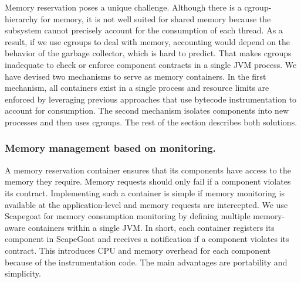 Memory reservation poses a unique challenge.
Although there is a cgroup-hierarchy for memory, it is not well suited for shared memory because the subsystem cannot precisely account for the consumption of each thread.
As a result, if we use cgroups to deal with memory, accounting would depend on the behavior of the garbage collector, which is hard to predict.
That makes cgroups inadequate to check or enforce component contracts in a single JVM process.
We have devised two mechanisms
to serve as memory containers.
In the first mechanism, all containers exist in a single process and resource limits are enforced by leveraging previous approaches
that use bytecode instrumentation to account for consumption.
The second mechanism
isolates components into new processes and then uses cgroups. %
The rest of the section describes both solutions.

\subsubsection{Memory management based on monitoring.}
A memory reservation container ensures that its components have access to the memory they require.
Memory requests should only fail if a component violates its contract.
Implementing such a container is simple if memory monitoring is available at the application-level and memory requests are intercepted.
We use Scapegoat \cite{gonzalezherrera:hal-00983045} for memory consumption monitoring by defining multiple memory-aware containers within a single JVM.
In short, each container registers its component in ScapeGoat and receives a notification if a component violates its contract.
This introduces CPU and memory overhead for each component because of the instrumentation code.
The main advantages are portability and simplicity.

